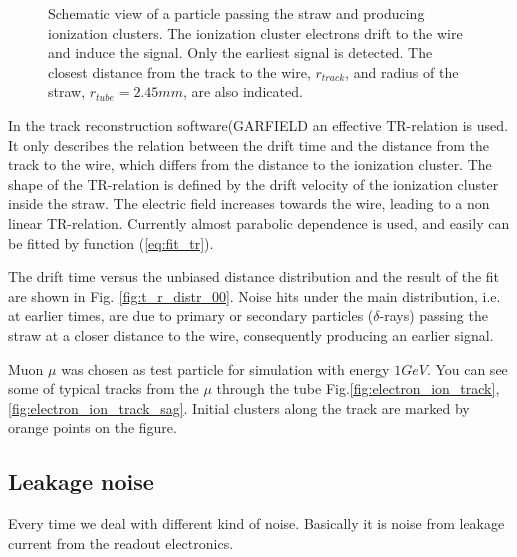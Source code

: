 \documentclass[]{article}
\begin{document}
\begin{figure}[h]
	\caption{Schematic view of a particle passing the straw and producing
ionization clusters. The ionization cluster electrons drift to the wire and
induce the signal. Only the earliest signal is detected. The closest distance
from the track to the wire, $r_{track}$, and radius of the straw, $r_{tube} = 2.45 mm$, are also indicated.}
	\label{fig:track_reconstruction}
	\end{figure}


	In the track reconstruction software(GARFIELD \cite{garfield} an effective TR-relation is used. It only describes the relation between the drift time and the distance from the track to the wire, which differs from the distance to the ionization cluster. The shape of the TR-relation is defined by the drift velocity of the ionization cluster inside the straw. The electric field increases towards the wire, leading to a non linear TR-relation. Currently almost parabolic dependence is used, and easily can be fitted by function (\ref{eq:fit_tr}).

	The drift time versus the unbiased distance distribution and the result of the fit are shown in Fig. \ref{fig:t_r_distr_00}. Noise hits under the main distribution, i.e. at earlier times, are due to primary or secondary particles ($\delta$-rays) passing the straw at a closer distance to the wire, consequently producing an earlier signal.
	
	Muon $\mu$ was chosen as test particle for simulation with energy $1GeV$. You can see some of typical tracks from the $\mu$ through the tube Fig.\ref{fig:electron_ion_track},\ref{fig:electron_ion_track_sag}. Initial clusters along the track are marked by orange points on the figure.
		
	
	\subsection{ Leakage noise}
	Every time we deal with different kind of noise. Basically it is noise from  leakage current from the readout electronics.
\end{document}

